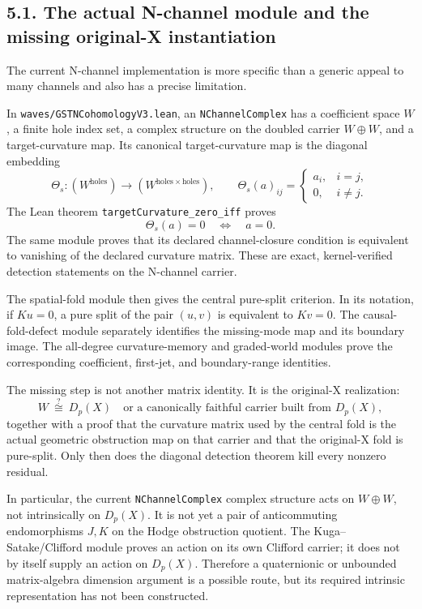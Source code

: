 \subsection*{5.1. The actual N-channel module and the missing original-X instantiation}

The current N-channel implementation is more specific than a generic appeal to many channels and also has a precise limitation.

In \texttt{waves/GSTNCohomologyV3.lean}, an \texttt{NChannelComplex} has a coefficient space \(W\), a finite hole index set, a complex structure on the doubled carrier \(W\oplus W\), and a target-curvature map. Its canonical target-curvature map is the diagonal embedding
\[
\Theta_s:(W^{\mathrm{holes}})\longrightarrow
(W^{\mathrm{holes}\times\mathrm{holes}}),
\qquad
\Theta_s(a)_{ij}=
\begin{cases}
a_i,&i=j,\\
0,&i\ne j.
\end{cases}
\]
The Lean theorem \texttt{targetCurvature\_zero\_iff} proves
\[
\Theta_s(a)=0\quad\Longleftrightarrow\quad a=0.
\]
The same module proves that its declared channel-closure condition is equivalent to vanishing of the declared curvature matrix. These are exact, kernel-verified detection statements on the N-channel carrier.

The spatial-fold module then gives the central pure-split criterion. In its notation, if \(K u=0\), a pure split of the pair \((u,v)\) is equivalent to \(K v=0\). The causal-fold-defect module separately identifies the missing-mode map and its boundary image. The all-degree curvature-memory and graded-world modules prove the corresponding coefficient, first-jet, and boundary-range identities.

The missing step is not another matrix identity. It is the original-X realization:
\[
W\ \stackrel{?}{\cong}\ D_p(X)
\quad\text{or a canonically faithful carrier built from }D_p(X),
\]
together with a proof that the curvature matrix used by the central fold is the actual geometric obstruction map on that carrier and that the original-X fold is pure-split. Only then does the diagonal detection theorem kill every nonzero residual.

In particular, the current \texttt{NChannelComplex} complex structure acts on \(W\oplus W\), not intrinsically on \(D_p(X)\). It is not yet a pair of anticommuting endomorphisms \(J,K\) on the Hodge obstruction quotient. The Kuga--Satake/Clifford module proves an action on its own Clifford carrier; it does not by itself supply an action on \(D_p(X)\). Therefore a quaternionic or unbounded matrix-algebra dimension argument is a possible route, but its required intrinsic representation has not been constructed.

